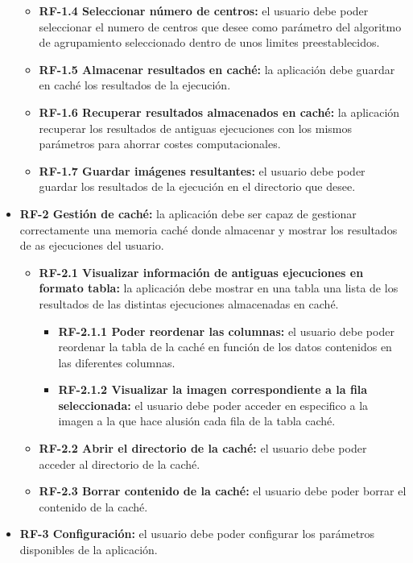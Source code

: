 \begin{itemize}
\begin{itemize}
        \item \textbf{RF-1.4 Seleccionar número de centros:} el usuario debe poder seleccionar el numero de centros que desee como parámetro del algoritmo de agrupamiento seleccionado dentro de unos limites preestablecidos.
        \item \textbf{RF-1.5 Almacenar resultados en caché:} la aplicación debe guardar en caché los resultados de la ejecución.
        \item \textbf{RF-1.6 Recuperar resultados almacenados en caché:} la aplicación recuperar los resultados de antiguas ejecuciones con los mismos parámetros para ahorrar costes computacionales.
        \item \textbf{RF-1.7 Guardar imágenes resultantes:} el usuario debe poder guardar los resultados de la ejecución en el directorio que desee.
    \end{itemize}
    \item \textbf{RF-2 Gestión de caché:} la aplicación debe ser capaz de gestionar correctamente una memoria caché donde almacenar y mostrar los resultados de as ejecuciones del usuario.
    \begin{itemize}
        \item \textbf{RF-2.1 Visualizar información de antiguas ejecuciones en formato tabla:} la aplicación debe mostrar en una tabla una lista de los resultados de las distintas ejecuciones almacenadas en caché.
        \begin{itemize}
            \item \textbf{RF-2.1.1 Poder reordenar las columnas:} el usuario debe poder reordenar la tabla de la caché en función de los datos contenidos en las diferentes columnas.
            \item \textbf{RF-2.1.2 Visualizar la imagen correspondiente a la fila seleccionada:} el usuario debe poder acceder en especifico a la imagen a la que hace alusión cada fila de la tabla caché.
        \end{itemize}
        \item \textbf{RF-2.2 Abrir el directorio de la caché:} el usuario debe poder acceder al directorio de la caché.
        \item \textbf{RF-2.3 Borrar contenido de la caché:} el usuario debe poder borrar el contenido de la caché.
    \end{itemize}
    \item \textbf{RF-3 Configuración:} el usuario debe poder configurar los parámetros disponibles de la aplicación. 
    \begin{itemize}

\end{itemize}
\end{itemize}
